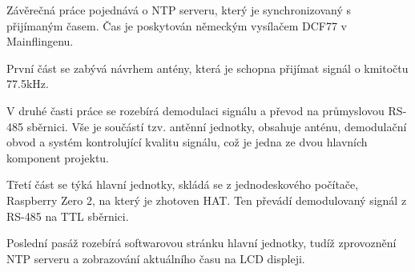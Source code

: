 Závěrečná práce pojednává o NTP serveru, který je synchronizovaný s přijímaným časem. Čas
je poskytován německým vysílačem DCF77 v Mainflingenu.

První část se zabývá návrhem antény, která je schopna přijímat signál o kmitočtu 77.5kHz.

V druhé časti práce se rozebírá demodulaci signálu a převod na průmyslovou RS-485
sběrnici. Vše je součástí tzv. antěnní jednotky, obsahuje anténu, demodulační obvod a systém kontrolující kvalitu
signálu, což je jedna ze dvou hlavních komponent projektu.

Třetí část se týká hlavní jednotky, skládá se z jednodeskového počítače, Raspberry Zero 2,
na který je zhotoven HAT. Ten převádí demodulovaný signál z RS-485 na TTL sběrnici.

Poslední pasáž rozebírá softwarovou stránku hlavní jednotky, tudíž zprovoznění NTP
serveru a zobrazování aktuálního času na LCD displeji.

